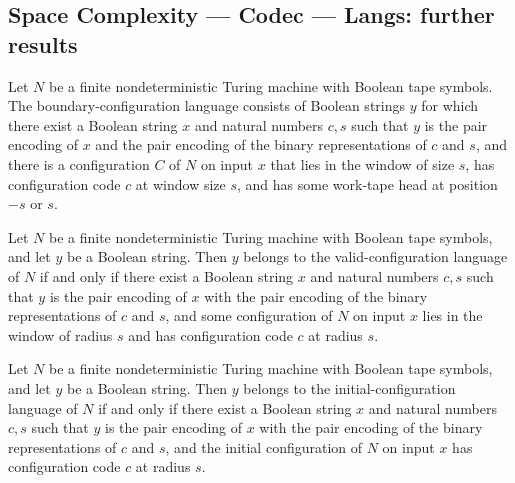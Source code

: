 \subsection*{Space Complexity --- Codec --- Langs: further results}

\begin{definition}
\label{Complexity.Codec.edgeLang}
\leanok
{}
Let $N$ be a finite nondeterministic Turing machine with Boolean tape symbols. The
boundary-configuration language consists of Boolean strings $y$ for which there exist a
Boolean string $x$ and natural numbers $c,s$ such that $y$ is the pair encoding of $x$
and the pair encoding of the binary representations of $c$ and $s$, and there is a
configuration $C$ of $N$ on input $x$ that lies in the window of size $s$, has
configuration code $c$ at window size $s$, and has some work-tape head at position $-s$
or $s$.
\end{definition}

\begin{lemma}
\label{Complexity.Codec.mem_validLang_iff}
\leanok
{}
Let $N$ be a finite nondeterministic Turing machine with Boolean tape symbols, and let
$y$ be a Boolean string. Then $y$ belongs to the valid-configuration language of $N$ if
and only if there exist a Boolean string $x$ and natural numbers $c,s$ such that $y$ is
the pair encoding of $x$ with the pair encoding of the binary representations of $c$ and
$s$, and some configuration of $N$ on input $x$ lies in the window of radius $s$ and has
configuration code $c$ at radius $s$.
\end{lemma}

\begin{lemma}
\label{Complexity.Codec.mem_initLang_iff}
\leanok
{}
Let $N$ be a finite nondeterministic Turing machine with Boolean tape symbols, and let
$y$ be a Boolean string. Then $y$ belongs to the initial-configuration language of $N$
if and only if there exist a Boolean string $x$ and natural numbers $c,s$ such that $y$
is the pair encoding of $x$ with the pair encoding of the binary representations of $c$
and $s$, and the initial configuration of $N$ on input $x$ has configuration code $c$ at
radius $s$.
\end{lemma}

